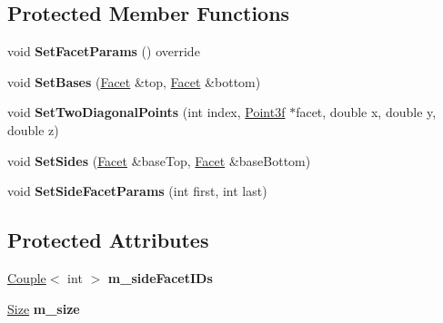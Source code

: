 \subsection*{Protected Member Functions}
\begin{DoxyCompactItemize}
\item 
\mbox{\label{class_column_a6c1b221d3b77b84dc327080bdc832dc8}} 
void {\bfseries Set\+Facet\+Params} () override
\item 
\mbox{\label{class_column_af9e69ceebb96af7c4968e51cdcf7f01a}} 
void {\bfseries Set\+Bases} (\mbox{\hyperlink{class_facet}{Facet}} \&top, \mbox{\hyperlink{class_facet}{Facet}} \&bottom)
\item 
\mbox{\label{class_column_ac0558dde864e35ac694a4463a0cadb99}} 
void {\bfseries Set\+Two\+Diagonal\+Points} (int index, \mbox{\hyperlink{struct_point3f}{Point3f}} $\ast$facet, double x, double y, double z)
\item 
\mbox{\label{class_column_aa12a30383a19d408f4d57b9aa2b348a2}} 
void {\bfseries Set\+Sides} (\mbox{\hyperlink{class_facet}{Facet}} \&base\+Top, \mbox{\hyperlink{class_facet}{Facet}} \&base\+Bottom)
\item 
\mbox{\label{class_column_aaff3281532436d6c70c0eaca569665d8}} 
void {\bfseries Set\+Side\+Facet\+Params} (int first, int last)
\end{DoxyCompactItemize}
\subsection*{Protected Attributes}
\begin{DoxyCompactItemize}
\item 
\mbox{\label{class_column_aad02a5a2b9c19658759d57d399e84ce4}} 
\mbox{\hyperlink{class_couple}{Couple}}$<$ int $>$ {\bfseries m\+\_\+side\+Facet\+I\+Ds}
\item 
\mbox{\label{class_column_a6d4ce98d9797d37ce75073ab9853e218}} 
\mbox{\hyperlink{struct_size}{Size}} {\bfseries m\+\_\+size}
\end{DoxyCompactItemize}
